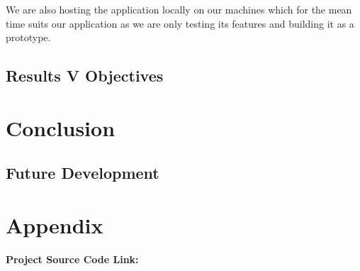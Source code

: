 \documentclass[12pt,a4paper,oneside,openany]{book}
\begin{document}
We are also hosting the application locally on our machines which for the mean time suits our application as we are only testing its features and building it as a prototype.

\section{Results V Objectives}

\chapter{Conclusion}

\section{Future Development}

\chapter{Appendix}

\textbf{Project Source Code Link:} \\




\nocite{*}
\end{document}
